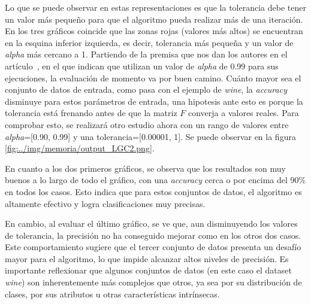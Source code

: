 Lo que se puede observar en estas representaciones es que la tolerancia debe tener un valor más pequeño para que el algoritmo pueda realizar más de una iteración. En los tres gráficos coincide que las zonas rojas (valores más altos) se encuentran en la esquina inferior izquierda, es decir, tolerancia más pequeña y un valor de \textit{alpha} más cercano a 1. Partiendo de la premisa que nos dan los autores en el artículo~\cite{LGC}, en el que indican que utilizan un valor de \textit{alpha} de 0.99 para sus ejecuciones, la evaluación de momento va por buen camino. Cuánto mayor sea el conjunto de datos de entrada, como pasa con el ejemplo de \textit{wine}, la \textit{accuracy} disminuye para estos parámetros de entrada, una hipotesis ante esto es porque la tolerancia está frenando antes de que la matriz $F$ converja a valores reales.
Para comprobar esto, se realizará otro estudio ahora con un rango de valores entre \textit{alpha}=[0.90, 0.99] y una tolerancia=[0.00001, 1]. Se puede observar en la figura \ref{fig:../img/memoria/output_LGC2.png}.

En cuanto a los dos primeros gráficos, se observa que los resultados son muy buenos a lo largo de todo el gráfico, con una \textit{accuracy} cerca o por encima del 90\% en todos los casos. Esto indica que para estos conjuntos de datos, el algoritmo es altamente efectivo y logra clasificaciones muy precisas.

En cambio, al evaluar el último gráfico, se ve que, aun disminuyendo los valores de tolerancia, la precisión no ha conseguido mejorar como en los otros dos casos. Este comportamiento sugiere que el tercer conjunto de datos presenta un desafío mayor para el algoritmo, lo que impide alcanzar altos niveles de precisión. Es importante reflexionar que algunos conjuntos de datos (en este caso el dataset \textit{wine}) son inherentemente más complejos que otros, ya sea por su distribución de clases, por sus atributos u otras características intrínsecas.

